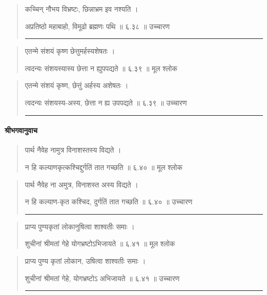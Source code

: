 \begin{quotation}

कच्चिन् नौभय विभ्रष्टः, छिन्नाभ्रम इव नश्यति  ।  

अप्रतिष्ठो महाबाहो, विमूढो ब्रह्मणः पथि  ॥ ६.३८ ॥  उच्चारण

\noindent\rule{16cm}{0.4pt} 
\end{quotation}


\begin{quotation}  

एतन्मे संशयं कृष्ण छेत्तुमर्हस्यशेषतः  ।  

त्वदन्यः संशयस्यास्य छेत्ता न ह्युपपद्यते  ॥ ६.३९ ॥  मूल श्लोक
\end{quotation}

\begin{quotation}

एतन्मे संशयं कृष्ण, छेत्तुं अर्हस्य अशेषतः  ।  

त्वदन्यः संशयस्य-अस्य, छेत्ता न ह्य उपपद्यते  ॥ ६.३९ ॥  उच्चारण

\noindent\rule{16cm}{0.4pt} 
\end{quotation}


\paragraph{\sanskrit श्रीभगवानुवाच}
\begin{quotation}  


पार्थ नैवेह नामुत्र विनाशस्तस्य विद्यते  ।  

न हि कल्याणकृत्कश्चिद्दुर्गतिं तात गच्छति  ॥ ६.४० ॥  मूल श्लोक
\end{quotation}

\begin{quotation}

पार्थ नैवेह ना अमुत्र, विनाशस्त अस्य विद्यते  ।  

न हि कल्याण-कृत कश्चिद, दुर्गतिं तात गच्छति  ॥ ६.४० ॥  उच्चारण

\noindent\rule{16cm}{0.4pt} 
\end{quotation}


\begin{quotation}  

प्राप्य पुण्यकृतां लोकानुषित्वा शाश्वतीः समाः  ।  

शुचीनां श्रीमतां गेहे योगभ्रष्टोऽभिजायते  ॥ ६.४१ ॥  मूल श्लोक
\end{quotation}

\begin{quotation}

प्राप्य पुण्य कृतां लोकान, उषित्वा शाश्वतीः समाः  ।  

शुचीनां श्रीमतां गेहे, योगभ्रष्टोऽ अभिजायते  ॥ ६.४१ ॥  उच्चारण

\noindent\rule{16cm}{0.4pt} 
\end{quotation}



